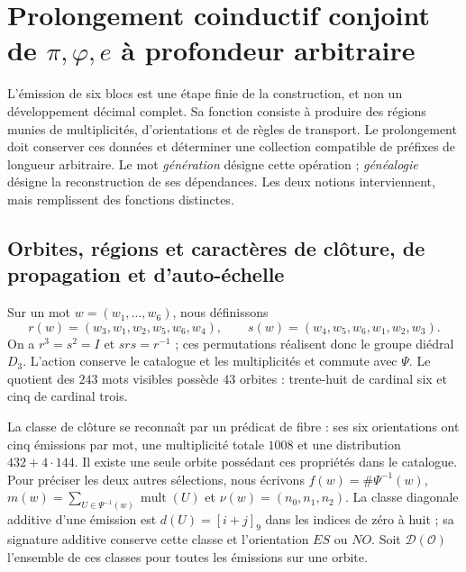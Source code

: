 \section{Prolongement coinductif conjoint de \texorpdfstring{\(\pi,\varphi,e\)}{pi, phi, e} à profondeur arbitraire}
\label{sec:generacion}

L'émission de six blocs est une étape finie de la construction, et non un développement décimal complet. Sa fonction consiste à produire des régions munies de multiplicités, d'orientations et de règles de transport. Le prolongement doit conserver ces données et déterminer une collection compatible de préfixes de longueur arbitraire. Le mot \emph{génération} désigne cette opération ; \emph{généalogie} désigne la reconstruction de ses dépendances. Les deux notions interviennent, mais remplissent des fonctions distinctes.

\subsection{Orbites, régions et caractères de clôture, de propagation et d'auto-échelle}

Sur un mot \(w=(w_1,\ldots,w_6)\), nous définissons
\[
 r(w)=(w_3,w_1,w_2,w_5,w_6,w_4),\qquad
 s(w)=(w_4,w_5,w_6,w_1,w_2,w_3).
\]
On a \(r^3=s^2=I\) et \(srs=r^{-1}\) ; ces permutations réalisent donc le groupe diédral \(D_3\). L'action conserve le catalogue et les multiplicités et commute avec \(\Psi\). Le quotient des \(243\) mots visibles possède \(43\) orbites : trente-huit de cardinal six et cinq de cardinal trois.

La classe de clôture se reconnaît par un prédicat de fibre : ses six orientations ont cinq émissions par mot, une multiplicité totale \(1008\) et une distribution \(432+4\cdot144\). Il existe une seule orbite possédant ces propriétés dans le catalogue. Pour préciser les deux autres sélections, nous écrivons \(f(w)=\#\Psi^{-1}(w)\), \(m(w)=\sum_{U\in\Psi^{-1}(w)}\operatorname{mult}(U)\) et \(\nu(w)=(n_0,n_1,n_2)\). La classe diagonale additive d'une émission est \(d(U)=[i+j]_9\) dans les indices de zéro à huit ; sa signature additive conserve cette classe et l'orientation \(ES\) ou \(NO\). Soit \(\mathcal D(\mathcal O)\) l'ensemble de ces classes pour toutes les émissions sur une orbite.

